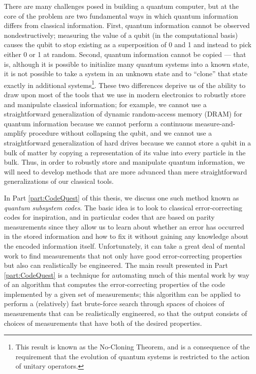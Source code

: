 \documentclass[12pt]{amsbook}
\theoremstyle{plain}
\theoremstyle{definition}
\theoremstyle{remark}
\begin{document}
There are many challenges posed in building a quantum computer, but at the core of the problem are two fundamental ways in which quantum information differs from classical information.  First, quantum information cannot be observed nondestructively;  measuring the value of a qubit (in the computational basis) causes the qubit to stop existing as a superposition of 0 and 1 and instead to pick either 0 or 1 at random.  Second, quantum information cannot be copied --- that is, although it is possible to initialize many quantum systems into a known state, it is not possible to take a system in an unknown state and to ``clone'' that state exactly in additional systems\footnote{This result is known as the No-Cloning Theorem, and is a consequence of the requirement that the evolution of quantum systems is restricted to the action of unitary operators\cite{Wootters1982}.}.  These two differences deprive us of the ability to draw upon most of the tools that we use in modern electronics to robustly store and manipulate classical information;  for example, we cannot use a straightforward generalization of dynamic random-access memory (DRAM) for quantum information because we cannot perform a continuous measure-and-amplify procedure without collapsing the qubit, and we cannot use a straightforward generalization of hard drives because we cannot store a qubit in a bulk of matter by copying a representation of its value into every particle in the bulk.  Thus, in order to robustly store and manipulate quantum information, we will need to develop methods that are more advanced than mere straightforward generalizations of our classical tools.

In Part \ref{part:CodeQuest} of this thesis, we discuss one such method known as \emph{quantum subsystem codes}.  The basic idea is to look to classical error-correcting codes for inspiration, and in particular codes that are based on parity measurements since they allow us to learn about whether an error has occurred in the stored information and how to fix it without gaining any knowledge about the encoded information itself.  Unfortunately, it can take a great deal of mental work to find measurements that not only have good error-correcting properties but also can realistically be engineered.  The main result presented in Part \ref{part:CodeQuest} is a technique for automating much of this mental work by way of an algorithm that computes the error-correcting properties of the code implemented by a given set of measurements;  this algorithm can be applied to perform a (relatively) fast brute-force search through spaces of choices of measurements that can be realistically engineered, so that the output consists of choices of measurements that have both of the desired properties.
\end{document}
